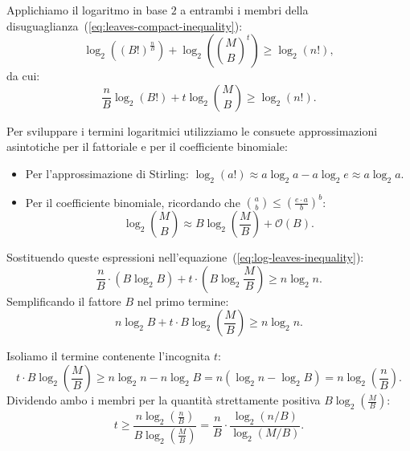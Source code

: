 Applichiamo il logaritmo in base $2$ a entrambi i membri della disuguaglianza~(\ref{eq:leaves-compact-inequality}):
\begin{equation}
  \log_2\left((B!)^{\frac{n}{B}}\right) + \log_2\left(\binom{M}{B}^t\right) \ge \log_2(n!),
\end{equation}
da cui:
\begin{equation}
  \frac{n}{B} \log_2(B!) + t \log_2\binom{M}{B} \ge \log_2(n!).
  \label{eq:log-leaves-inequality}
\end{equation}

Per sviluppare i termini logaritmici utilizziamo le consuete approssimazioni asintotiche per il fattoriale e per il coefficiente binomiale:
\begin{itemize}
  \item Per l'approssimazione di Stirling: $\log_2(a!) \approx a \log_2 a - a \log_2 e \approx a \log_2 a$.
  \item Per il coefficiente binomiale, ricordando che $\binom{a}{b} \le \left(\frac{e \cdot a}{b}\right)^b$:
  \begin{equation}
    \log_2 \binom{M}{B} \approx B \log_2\left(\frac{M}{B}\right) + \mathcal{O}(B).
  \end{equation}
\end{itemize}

Sostituendo queste espressioni nell'equazione~(\ref{eq:log-leaves-inequality}):
\begin{equation}
  \frac{n}{B} \cdot \left(B \log_2 B\right) + t \cdot \left(B \log_2 \frac{M}{B}\right) \ge n \log_2 n.
\end{equation}
Semplificando il fattore $B$ nel primo termine:
\begin{equation}
  n \log_2 B + t \cdot B \log_2\left(\frac{M}{B}\right) \ge n \log_2 n.
\end{equation}

Isoliamo il termine contenente l'incognita $t$:
\begin{equation}
  t \cdot B \log_2\left(\frac{M}{B}\right) \ge n \log_2 n - n \log_2 B = n \left(\log_2 n - \log_2 B\right) = n \log_2\left(\frac{n}{B}\right).
\end{equation}
Dividendo ambo i membri per la quantità strettamente positiva $B \log_2\left(\frac{M}{B}\right)$:
\begin{equation}
  t \ge \frac{n \log_2\left(\frac{n}{B}\right)}{B \log_2\left(\frac{M}{B}\right)} = \frac{n}{B} \cdot \frac{\log_2(n / B)}{\log_2(M / B)}.
\end{equation}

